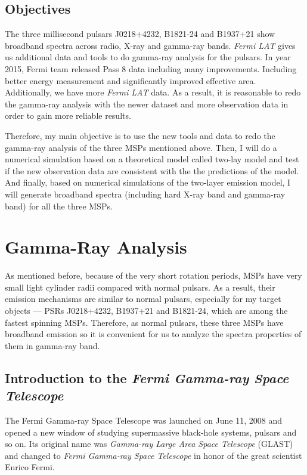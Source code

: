 \documentclass[12pt]{report}
\begin{document}
    \section{Objectives}
            The three millisecond pulsars J0218+4232, B1821-24 and B1937+21 show 
            broadband spectra across radio, X-ray and gamma-ray bands. \textit{Fermi LAT} gives us 
            additional data and tools to do gamma-ray analysis for the pulsars. 
            In year 2015, Fermi team released Pass 8 data including many improvements. Including 
            better energy measurement and 
            significantly improved effective area. Additionally, we have more \textit{Fermi LAT}
            data. As a result, it is reasonable to redo the gamma-ray analysis with the newer dataset and 
            more observation data in order to gain more reliable results. 

            Therefore, my main objective is to use the new tools and data to redo the gamma-ray
            analysis of the three MSPs mentioned above. 
            Then, I will do a numerical simulation based on a theoretical model called two-lay model and test if the new observation 
            data are consistent with the the predictions of the model. And finally, based on numerical simulations 
            of the two-layer emission model, I will generate broadband spectra (including hard X-ray band 
            and gamma-ray band) for all the three MSPs. 

  \chapter{Gamma-Ray Analysis}
      As mentioned before, because of the very short rotation periods, MSPs have very small light cylinder radii 
      compared with normal pulsars. As a result, their emission mechanisms are similar to normal pulsars, 
      especially for my target objects --- PSRs J0218+4232, B1937+21 and B1821-24, 
      which are among the fastest spinning MSPs. Therefore, as normal pulsars, these three 
      MSPs have broadband emission so it is convenient for us to analyze the spectra 
      properties of them in gamma-ray band.
  
      \section{Introduction to the \textit{Fermi Gamma-ray Space Telescope}}
        The Fermi Gamma-ray Space Telescope was launched on June 11, 2008 and opened a new window of studying
        supermassive black-hole systems, pulsars and so on. Its original name was \textit{Gamma-ray Large Area Space 
        Telescope} (GLAST) and changed to \textit{Fermi Gamma-ray Space Telescope} 
        in honor of the great scientist Enrico Fermi. 
\end{document}
